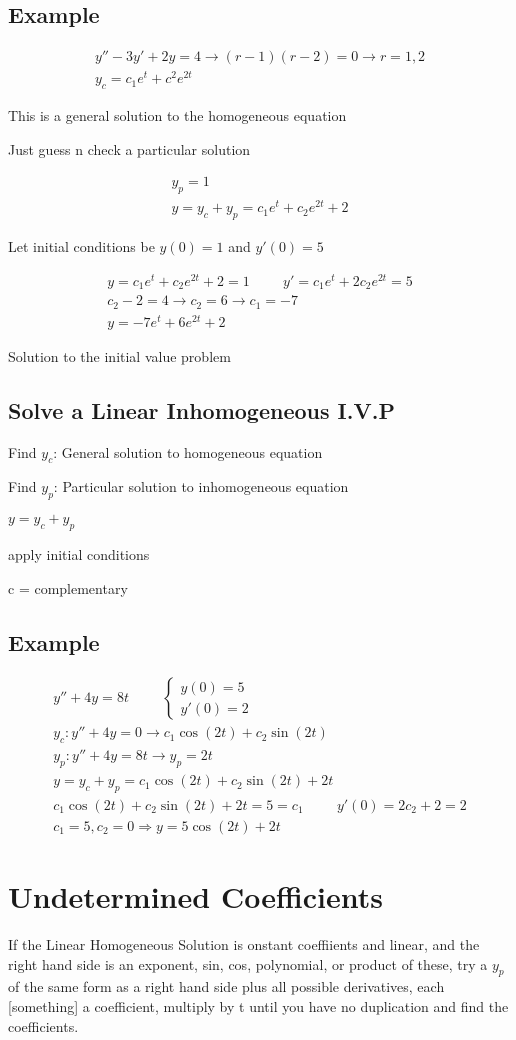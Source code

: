 \documentclass[fleqn]{report}
\newcommand{\hp}{\hspace{1cm}}
\newcommand{\equations} [1] {
\begin{gather*}
#1
\end{gather*}
}
\begin{document}
\subsection{Example}
\equations{
y'' - 3y' + 2y = 4
\rightarrow
(r - 1)(r - 2) = 0
\rightarrow
r = 1, 2
\\
y_c = c_1 e^t + c^2 e^{2t}
}
This is a general solution to the homogeneous equation

Just guess n check a particular solution
\equations{
y_p = 1
\\
y = y_c + y_p = c_1 e^t + c_2 e^{2t} + 2
}
Let initial conditions be $y(0) = 1$ and $y'(0) = 5$
\equations{
y = c_1 e^t + c_2 e^{2t} + 2 = 1
\hp
y' = c_1 e^t + 2c_2 e^{2t}  = 5
\\
c_2 - 2 = 4
\rightarrow
c_2 = 6
\rightarrow
c_1 = -7
\\
y = -7 e^t + 6 e^{2t} + 2
}
Solution to the initial value problem

\subsection{Solve a Linear Inhomogeneous I.V.P}
Find $y_c$: General solution to homogeneous equation

Find $y_p$: Particular solution to inhomogeneous equation

$y = y_c + y_p$

apply initial conditions

c = complementary

\subsection{Example}
\equations{
y'' + 4y = 8t
\hp
\begin{cases}
y(0) = 5\\
y'(0) = 2
\end{cases}
\\
y_c: y'' + 4y = 0
\rightarrow
c_1 \cos (2t) + c_2 \sin (2t)
\\
y_p:  y'' + 4y = 8t
\rightarrow
y_p = 2t
\\
y = y_c + y_p = c_1 \cos (2t) + c_2 \sin (2t) + 2t
\\
c_1 \cos (2t) + c_2 \sin (2t) + 2t = 5 = c_1
\hp
y'(0) = 2c_2 + 2 = 2
\\
c_1 = 5, c_2 = 0 \Rightarrow
y = 5\cos (2t) + 2t
}

\section{Undetermined Coefficients}
If the Linear Homogeneous Solution is onstant coeffiients and linear, and the right hand side is an exponent, sin, cos, polynomial, or product of these, try a $y_p$ of the same form as a right hand side plus all possible derivatives, each [something] a coefficient, multiply by t until you have no duplication and find the coefficients.
\end{document}
